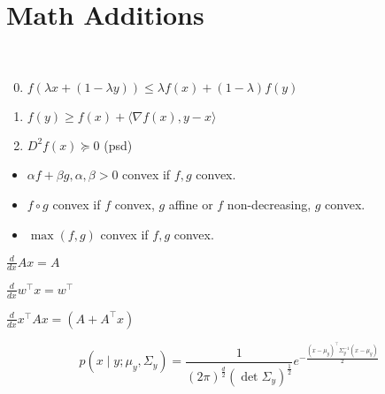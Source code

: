 \section{Math Additions}

\begin{definition}[Convexity] \
  \begin{enumerate}
    \setcounter{enumi}{-1}
    \item \(f(\lambda x + (1 - \lambda y)) \leq \lambda f(x) + (1 - \lambda)f(y)\)
    \item \(f(y) \geq f(x) + \langle \nabla f(x), y - x \rangle\)
    \item \(D^2f(x) \succeq 0\) (psd)
  \end{enumerate}
  \begin{itemize}
    \item \(\alpha f + \beta g, \alpha, \beta > 0\) convex if \(f, g\) convex.
    \item \(f \circ g\) convex if \(f\) convex, \(g\) affine or \(f\) non-decreasing, \(g\) convex.
    \item \(\max(f, g)\) convex if \(f, g\) convex.
  \end{itemize}
\end{definition}

\begin{definition}
  \begin{itemize*}
    \item \(\frac{d}{dx}Ax = A\)
    \item \(\frac{d}{dx}w^\top x = w^\top\)
    \item \(\frac{d}{dx} x^\top A x = (A + A^\top x)\)
  \end{itemize*}
\end{definition}

\begin{definition}
  \[p(x \mid y; \mu_y, \Sigma_y) = \frac{1}{(2\pi)^{\frac{d}{2}}(\det \Sigma_y)^{\frac{1}{2}}} e^{- \frac{(x - \mu_y)^\top \Sigma_y^{-1} (x - \mu_y)}{2}}\]
\end{definition}